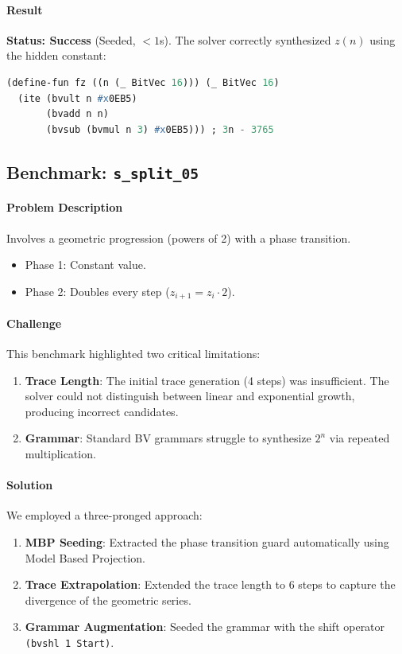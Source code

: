 \documentclass{article}
\begin{document}
\paragraph{Result}
\textbf{Status: Success} (Seeded, $<1$s).
The solver correctly synthesized $z(n)$ using the hidden constant:
\begin{lstlisting}[language=Lisp]
(define-fun fz ((n (_ BitVec 16))) (_ BitVec 16) 
  (ite (bvult n #x0EB5) 
       (bvadd n n)
       (bvsub (bvmul n 3) #x0EB5))) ; 3n - 3765
\end{lstlisting}

\subsection{Benchmark: \texttt{s\_split\_05}}
\paragraph{Problem Description}
Involves a geometric progression (powers of 2) with a phase transition.
\begin{itemize}
    \item Phase 1: Constant value.
    \item Phase 2: Doubles every step ($z_{i+1} = z_i \cdot 2$).
\end{itemize}

\paragraph{Challenge}
This benchmark highlighted two critical limitations:
\begin{enumerate}
    \item \textbf{Trace Length}: The initial trace generation (4 steps) was insufficient. The solver could not distinguish between linear and exponential growth, producing incorrect candidates.
    \item \textbf{Grammar}: Standard BV grammars struggle to synthesize $2^n$ via repeated multiplication.
\end{enumerate}

\paragraph{Solution}
We employed a three-pronged approach:
\begin{enumerate}
    \item \textbf{MBP Seeding}: Extracted the phase transition guard automatically using Model Based Projection.
    \item \textbf{Trace Extrapolation}: Extended the trace length to 6 steps to capture the divergence of the geometric series.
    \item \textbf{Grammar Augmentation}: Seeded the grammar with the shift operator \texttt{(bvshl 1 Start)}.
\end{enumerate}
\end{document}
